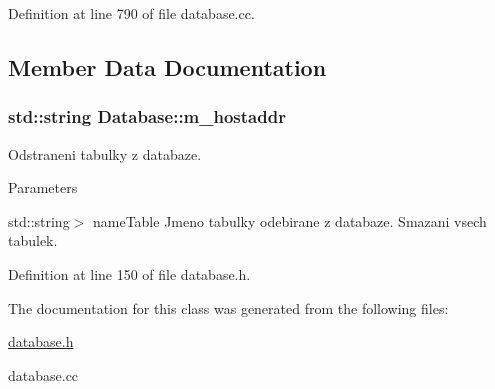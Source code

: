 Definition at line 790 of file database.cc.



\subsection{Member Data Documentation}
\hypertarget{classDatabase_a73a3ea4197118649af11db64a0905f26}{
\subsubsection[{m\_\-hostaddr}]{\setlength{\rightskip}{0pt plus 5cm}std::string {\bf Database::m\_\-hostaddr}}}
\label{classDatabase_a73a3ea4197118649af11db64a0905f26}
Odstraneni tabulky z databaze. 
\begin{DoxyParams}{Parameters}
\item[\mbox{\tt[in]} {\em $<$const}]std::string$>$ nameTable Jmeno tabulky odebirane z databaze. Smazani vsech tabulek. \end{DoxyParams}


Definition at line 150 of file database.h.



The documentation for this class was generated from the following files:\begin{DoxyCompactItemize}
\item 
\hyperlink{database_8h}{database.h}\item 
database.cc\end{DoxyCompactItemize}
